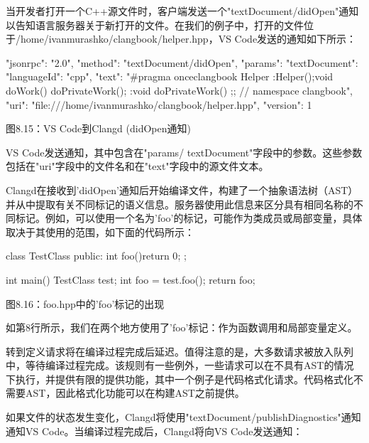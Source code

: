 
当开发者打开一个C++源文件时，客户端发送一个"textDocument/didOpen"通知以告知语言服务器关于新打开的文件。在我们的例子中，打开的文件位于/home/ivanmurashko/clangbook/helper.hpp，VS Code发送的通知如下所示：

\begin{shell}
{
  "jsonrpc": "2.0",
  "method": "textDocument/didOpen",
  "params": {
    "textDocument": {
      "languageId": "cpp",
      "text": "#pragma once\n\nnamespace clangbook {\nclass Helper {\npublic:\n  Helper(){};\n\n  void doWork() { doPrivateWork(); }\n\nprivate:\n  void doPrivateWork() {}\n};\n}; // namespace clangbook\n",
      "uri": "file:///home/ivanmurashko/clangbook/helper.hpp",
      "version": 1
     }
   }
}
\end{shell}


\begin{center}
图8.15：VS Code到Clangd (didOpen通知)
\end{center}

VS Code发送通知，其中包含在"params/ textDocument"字段中的参数。这些参数包括在"uri"字段中的文件名和在"text"字段中的源文件文本。

Clangd在接收到'didOpen'通知后开始编译文件，构建了一个抽象语法树（AST）并从中提取有关不同标记的语义信息。服务器使用此信息来区分具有相同名称的不同标记。例如，可以使用一个名为'foo'的标记，可能作为类成员或局部变量，具体取决于其使用的范围，如下面的代码所示：

\begin{cpp}
class TestClass {
public:
  int foo(){return 0};
};

int main() {
  TestClass test;
  int foo = test.foo();
  return foo;
}
\end{cpp}

\begin{center}
图8.16：foo.hpp中的'foo'标记的出现
\end{center}

如第8行所示，我们在两个地方使用了'foo'标记：作为函数调用和局部变量定义。

转到定义请求将在编译过程完成后延迟。值得注意的是，大多数请求被放入队列中，等待编译过程完成。该规则有一些例外，一些请求可以在不具有AST的情况下执行，并提供有限的提供功能，其中一个例子是代码格式化请求。代码格式化不需要AST，因此格式化功能可以在构建AST之前提供。

如果文件的状态发生变化，Clangd将使用"textDocument/publishDiagnostics"通知通知VS Code。当编译过程完成后，Clangd将向VS Code发送通知：

